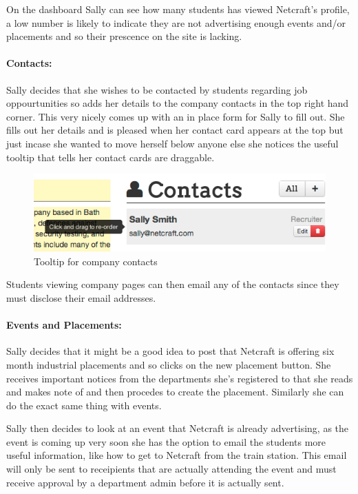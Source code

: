     On the dashboard Sally can see how many students has viewed Netcraft's profile, a low number is likely to indicate they are not advertising enough events and/or placements and so their prescence on the site is lacking. 


  \paragraph{Contacts:}
    Sally decides that she wishes to be contacted by students regarding job oppourtunities so adds her details to the company contacts in the top right hand corner. This very nicely comes up with an in place form for Sally to fill out.
    She fills out her details and is pleased when her contact card appears at the top but just incase she wanted to move herself below anyone else she notices the useful tooltip that tells her contact cards are draggable.

    \begin{figure}[H]\centering
    \includegraphics[scale=0.5]{images/user_experiences/company/netcraft_company_contact_tooltip}
    \caption{Tooltip for company contacts}
    \end{figure}
    Students viewing company pages can then email any of the contacts since they must disclose their email addresses.

  \paragraph{Events and Placements:}
    Sally decides that it might be a good idea to post that Netcraft is offering six month industrial placements and so clicks on the new placement button. 
    She receives important notices from the departments she's registered to that she reads and makes note of and then procedes to create the placement.
    Similarly she can do the exact same thing with events.

    Sally then decides to look at an event that Netcraft is already advertising, as the event is coming up very soon she has the option to email the students more useful information, like how to get to Netcraft from the train station.
    This email will only be sent to receipients that are actually attending the event and must receive approval by a department admin before it is actually sent.

